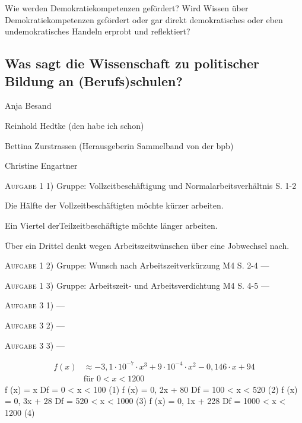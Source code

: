Wie werden Demokratiekompetenzen gefördert? Wird Wissen über Demokratiekompetenzen gefördert oder gar direkt demokratisches oder eben undemokratisches Handeln erprobt und reflektiert?

\subsection{Was sagt die Wissenschaft zu politischer Bildung an (Berufs)schulen?}
Anja Besand

Reinhold Hedtke (den habe ich schon)

Bettina Zurstrassen (Herausgeberin Sammelband von der bpb) 

Christine Engartner

\textsc{Aufgabe 1} 1) Gruppe: Vollzeitbeschäftigung und Normalarbeitsverhältnis S. 1-2 \quad 
\begin{myitemize}
    \item Die Hälfte der Vollzeitbeschäftigten möchte kürzer arbeiten.
    \item Ein Viertel derTeilzeitbeschäftigte möchte länger arbeiten.
    \item Über ein Drittel denkt wegen Arbeitszeitwünschen über eine Jobwechsel nach.
    \item 
\end{myitemize}

\textsc{Aufgabe 1} 2) Gruppe: Wunsch nach Arbeitszeitverkürzung M4 S. 2-4 \quad ---

\textsc{Aufgabe 1} 3) Gruppe: Arbeitszeit- und Arbeitsverdichtung M4 S. 4-5 \quad ---


\textsc{Aufgabe 3} 1) \quad ---

\textsc{Aufgabe 3} 2) \quad ---

\textsc{Aufgabe 3} 3) \quad ---

\begin{align}
f(x) &\approx -3{,}1 \cdot 10^{-7} \cdot x^3 + 9 \cdot 10^{-4} \cdot x^2 - 0{,}146 \cdot x + 94 \\
     &\text{für } 0 < x < 1200
\end{align}
f (x) = x Df = {0 < x < 100} (1)
f (x) = 0, 2x + 80 Df = {100 < x < 520} (2)
f (x) = 0, 3x + 28 Df = {520 < x < 1000} (3)
f (x) = 0, 1x + 228 Df = {1000 < x < 1200} (4)


